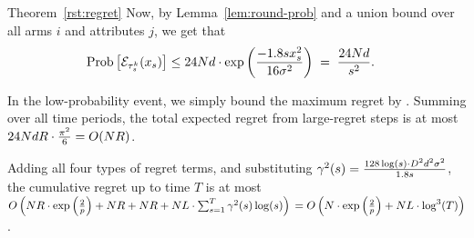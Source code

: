 \begin{emptyextraproof}{Theorem~\ref{rst:regret}}
Now, by Lemma~\ref{lem:round-prob} and a union bound over all arms $i$
and attributes $j$, we get that 
\begin{align*}
\Prob{\AccEU{\tau_s^k}{x_s}}
& \leq 24 \ARMNUM d \cdot \exp \left( \frac{-1.8 s x_s^2}{16 \sigma^2} \right)
\; = \; \frac{24 \ARMNUM d}{s^2}.
\end{align*}

In the low-probability event, we simply bound the maximum regret by \MAXR.
Summing over all time periods,
the total expected regret from large-regret steps is at most
$24 N d R \cdot \frac{\pi^2}{6} = O(N R)$.

Adding all four types of regret terms,
and substituting 
$\EarlyCut[2]{s} = \frac{128 \log(s) \cdot \Diam^2 d^2 \sigma^2}{1.8 s}$,
the cumulative regret up to time $T$ is at most
$
O \left(\ARMNUM \MAXR \cdot \exp \left( \frac{2}{p} \right)
+ \ARMNUM \MAXR
+ \ARMNUM \MAXR
+ \ARMNUM \TieDensity \cdot \sum_{s=1}^{T} \EarlyCut[2]{s} \log(s) \right)\\
= 
O \left(\ARMNUM  \cdot \exp \left( \frac{2}{p} \right)
+ \ARMNUM \TieDensity \cdot \log^3(T) \right)$.\QED
\end{emptyextraproof}
